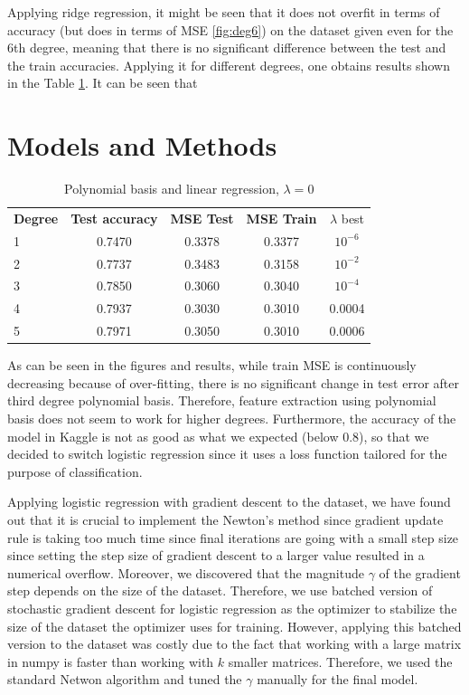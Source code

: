 \documentclass[10pt,conference,compsocconf]{IEEEtran}
\begin{document}
Applying ridge regression, it might be seen that it does not overfit in terms of accuracy (but does in terms of MSE \ref{fig:deg6}) on the dataset given even for the 6th degree, meaning that there is no significant difference between the test and the train accuracies. Applying it for different degrees, one obtains results shown in the Table \ref{tab:degrees}. It can be seen that 

\section{Models and Methods}
\begin{table}[!htb]
	\caption{Polynomial basis and linear regression, $\lambda=0$}	\label{tab:degrees}
	\centering\begin{tabular}{|lcccc|}\hline
		{\bf Degree} & {\bf Test accuracy} & {\bf MSE Test} & {\bf MSE Train} & {$\lambda$ best}\\
		1 & 0.7470 & 0.3378 & 0.3377 & $10^{-6}$\\
		2 & 0.7737 & 0.3483 & 0.3158 & $10^{-2}$\\		
		3 & 0.7850 & 0.3060 & 0.3040 & $10^{-4}$\\
		4 & 0.7937 & 0.3030 & 0.3010 & 0.0004\\
		5 & 0.7971 & 0.3050 & 0.3010 & 0.0006\\\hline
	\end{tabular}
\end{table}

As can be seen in the figures and results, while train MSE is continuously decreasing because of over-fitting, there is no significant change in test error after third degree polynomial basis. Therefore, feature extraction using polynomial basis does not seem to work for higher degrees. Furthermore, the accuracy of the model in Kaggle is not as good as what we expected (below 0.8), so that we decided to switch logistic regression since it uses a loss function tailored for the purpose of classification.

Applying logistic regression with gradient descent to the dataset, we have found out that it is crucial to implement the Newton's method since gradient update rule is taking too much time since final iterations are going with a small step size since setting the step size of gradient descent to a larger value resulted in a numerical overflow. Moreover, we discovered that the magnitude $\gamma$ of the gradient step depends on the size of the dataset. Therefore, we use batched version of stochastic gradient descent for logistic regression as the optimizer to stabilize the size of the dataset the optimizer uses for training.
However, applying this batched version to the dataset was costly due to the fact that working with a large matrix in numpy is faster than working with $k$ smaller matrices. Therefore, we used the standard Netwon algorithm and tuned the $\gamma$ manually for the final model.
\end{document}
